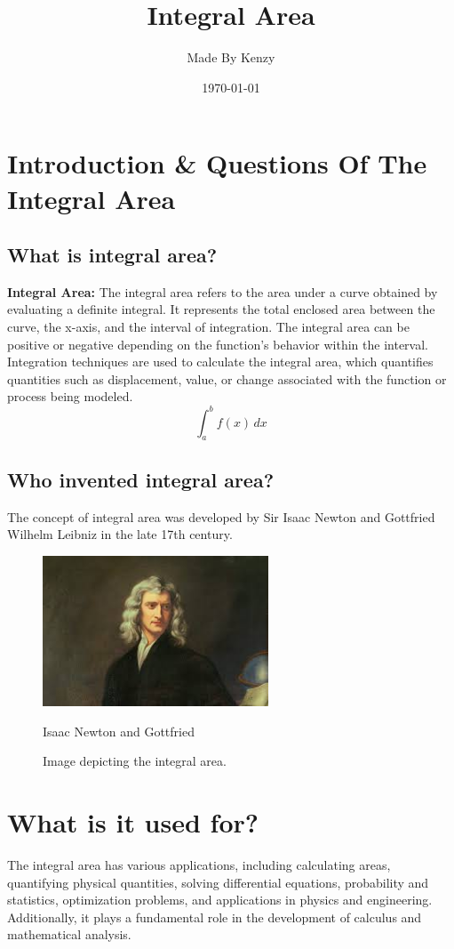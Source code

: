 \documentclass{article}
\begin{document}
\title{Integral Area}
\author{Made By Kenzy}
\date{\today}

\maketitle
\section{Introduction \& Questions Of The Integral Area}
\nopagecolor 
\subsection{What is integral area?}
\textbf{Integral Area:}
The integral area refers to the area under a curve obtained by evaluating a definite integral. It represents the total enclosed area between the curve, the x-axis, and the interval of integration. The integral area can be positive or negative depending on the function's behavior within the interval. Integration techniques are used to calculate the integral area, which quantifies quantities such as displacement, value, or change associated with the function or process being modeled.
\begin{equation}
    \int_a^b f(x) \, dx
\end{equation}
\subsection{Who invented integral area?}
The concept of integral area was developed by Sir Isaac Newton and Gottfried Wilhelm Leibniz in the late 17th century.
\begin{figure}[ht]
    \centering
    \includegraphics[width=0.6\textwidth]{Isaac Newton and Gottfried.jpg}
    \caption{Image depicting the integral area.}
    \label{fig:integral_area}
    \vspace{10pt}
    \small Isaac Newton and Gottfried
\end{figure}
\section{What is it used for?}
The integral area has various applications, including calculating areas, quantifying physical quantities, solving differential equations, probability and statistics, optimization problems, and applications in physics and engineering. Additionally, it plays a fundamental role in the development of calculus and mathematical analysis.
\end{document}
